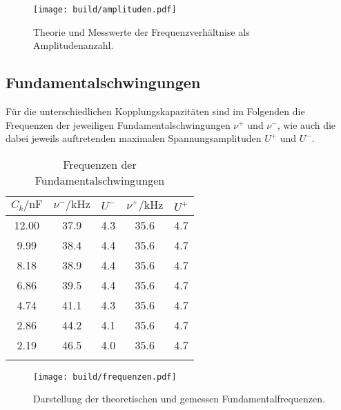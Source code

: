 \begin{figure}

    \centering
    \texttt{[image: build/amplituden.pdf]}
    \caption{Theorie und Messwerte der Frequenzverhältnise als Amplitudenanzahl.}
    \label{fig:amplituden}
\end{figure}

\FloatBarrier
\subsection{Fundamentalschwingungen}
Für die unterschiedlichen Kopplungskapazitäten sind im Folgenden die Frequenzen der jeweiligen
Fundamentalschwingungen $\nu^+$ und $\nu^-$, wie auch die dabei jeweils auftretenden maximalen
Spannungsamplituden $U^+$ und $U^-$.
\begin{table}
    \centering
    \caption{Frequenzen der Fundamentalschwingungen}
    \begin{tabular}{c c c c c}
    \toprule
    {$C_k / \si{\nano\farad}$} & {$\nu^- / \si{\kilo\hertz}$} & {$U^-$} & {$\nu^+ / \si{\kilo\hertz}$} & {$U^+$} \\
    \midrule
    12.00 & 37.9 & 4.3 & 35.6 & 4.7 \\
     9.99 & 38.4 & 4.4 & 35.6 & 4.7 \\
     8.18 & 38.9 & 4.4 & 35.6 & 4.7 \\
     6.86 & 39.5 & 4.4 & 35.6 & 4.7 \\
     4.74 & 41.1 & 4.3 & 35.6 & 4.7 \\
     2.86 & 44.2 & 4.1 & 35.6 & 4.7 \\
     2.19 & 46.5 & 4.0 & 35.6 & 4.7 \\
     \bottomrule
     \label{tab:b}
    \end{tabular}
\end{table}

\begin{figure}

    \centering
    \texttt{[image: build/frequenzen.pdf]}
    \caption{Darstellung der theoretischen und gemessen Fundamentalfrequenzen.}
    \label{fig:frequenzen}
\end{figure}

